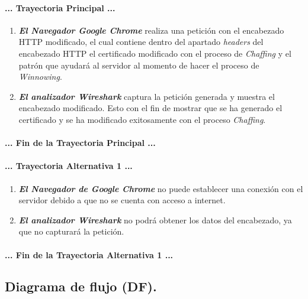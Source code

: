 \documentclass[12pt, a4paper, titlepage]{report}
\begin{document}
				\paragraph{... Trayectoria Principal ...}
				\begin{enumerate}
					\item \textbf{\textit{El Navegador Google Chrome}} realiza una petición con el encabezado HTTP modificado, el cual contiene dentro del apartado \textit{headers} del encabezado HTTP el certificado modificado con el proceso de \textit{Chaffing} y el patrón que ayudará al servidor al momento de hacer el proceso de \textit{Winnowing}.
					\item \textbf{\textit{El analizador Wireshark}} captura la petición generada y muestra el encabezado modificado. Esto con el fin de mostrar que se ha generado el certificado y se ha modificado exitosamente con el proceso \textit{Chaffing}.				
					\end{enumerate}
				\paragraph{... Fin de la Trayectoria Principal ...}
				
				\paragraph{... Trayectoria Alternativa 1 ...}
				\begin{enumerate}
					\item \textbf{\textit{El Navegador de Google Chrome}} no puede establecer una conexión con el servidor debido a que no se cuenta con acceso a internet.
					\item \textbf{\textit{El analizador Wireshark}} no podrá obtener los datos del encabezado, ya que no capturará la petición.
				\end{enumerate}
				\paragraph{... Fin de la Trayectoria Alternativa 1 ...}
			
			\subsection{Diagrama de flujo (DF).}
			    
\end{document}
